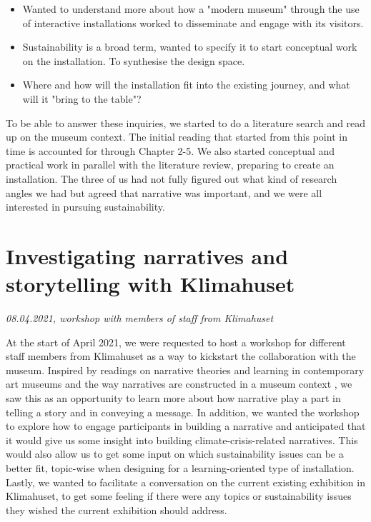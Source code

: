 \begin{itemize}
    \item Wanted to understand more about how a "modern museum" through the use of interactive installations worked to disseminate and engage with its visitors.
    \item Sustainability is a broad term, wanted to specify it to start conceptual work on the installation. To synthesise the design space.
    \item Where and how will the installation fit into the existing journey, and what will it "bring to the table"?
\end{itemize}

To be able to answer these inquiries, we started to do a literature search and read up on the museum context. The initial reading that started from this point in time is accounted for through Chapter 2-5. We also started conceptual and practical work in parallel with the literature review, preparing to create an installation. The three of us had not fully figured out what kind of research angles we had but agreed that narrative was important, and we were all interested in pursuing sustainability.


\section{Investigating narratives and storytelling with Klimahuset}
\par
\emph{08.04.2021, workshop with members of staff from Klimahuset}
\par

At the start of April 2021, we were requested to host a workshop for different staff members from Klimahuset as a way to kickstart the collaboration with the museum. Inspired by readings on narrative theories and learning in contemporary art museums and the way narratives are constructed in a museum context \autocite{narrative_sitzia}, we saw this as an opportunity to learn more about how narrative play a part in telling a story and in conveying a message. In addition, we wanted the workshop to explore how to engage participants in building a narrative and anticipated that it would give us some insight into building climate-crisis-related narratives. This would also allow us to get some input on which sustainability issues can be a better fit, topic-wise when designing for a learning-oriented type of installation. Lastly, we wanted to facilitate a conversation on the current existing exhibition in Klimahuset, to get some feeling if there were any topics or sustainability issues they wished the current exhibition should address. 

